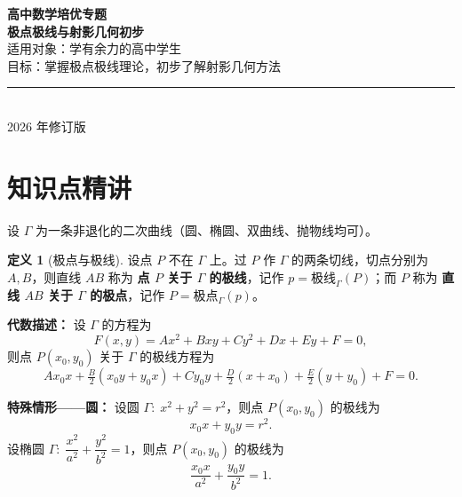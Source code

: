 \documentclass[12pt,a4paper]{ctexart}
\theoremstyle{definition}
\newtheorem*{defn}{定义}
\newcommand{\polar}{\text{极线}}
\newcommand{\pole}{\text{极点}}
\begin{document}
\begin{titlepage}
\centering
\vspace*{3cm}
{\Huge\bfseries\color{titleblue} 高中数学培优专题}\\[1.2cm]
{\LARGE\bfseries\color{accentred} 极点极线与射影几何初步}\\[2cm]
{\large\color{darkgray} 适用对象：学有余力的高中学生}\\[0.6cm]
{\large\color{darkgray} 目标：掌握极点极线理论，初步了解射影几何方法}\\[3cm]
\rule{0.6\textwidth}{0.4pt}\\[0.8cm]
{\large\color{titleblue} 2026 年修订版}
\vfill
\end{titlepage}

\tableofcontents
\newpage

\section{知识点精讲}

\begin{knowledgebox}
设 $\Gamma$ 为一条非退化的二次曲线（圆、椭圆、双曲线、抛物线均可）。

\begin{defn}[极点与极线]
设点 $P$ 不在 $\Gamma$ 上。过 $P$ 作 $\Gamma$ 的两条切线，切点分别为 $A,B$，则直线 $AB$ 称为 \textbf{点 $P$ 关于 $\Gamma$ 的极线}，记作 $p=\polar_\Gamma(P)$；而 $P$ 称为 \textbf{直线 $AB$ 关于 $\Gamma$ 的极点}，记作 $P=\pole_\Gamma(p)$。
\end{defn}

\vspace{4pt}
\textbf{代数描述：}
设 $\Gamma$ 的方程为
\[
  F(x,y) = Ax^2 + Bxy + Cy^2 + Dx + Ey + F = 0,
\]
则点 $P(x_0,y_0)$ 关于 $\Gamma$ 的极线方程为
\[
  Ax_0 x + \tfrac{B}{2}(x_0 y + y_0 x) + Cy_0 y + \tfrac{D}{2}(x+x_0) + \tfrac{E}{2}(y+y_0) + F = 0.
\]

\textbf{特殊情形——圆：}
设圆 $\Gamma:\; x^2+y^2=r^2$，则点 $P(x_0,y_0)$ 的极线为
\[
  x_0 x + y_0 y = r^2.
\]
设椭圆 $\Gamma:\; \dfrac{x^2}{a^2}+\dfrac{y^2}{b^2}=1$，则点 $P(x_0,y_0)$ 的极线为
\[
  \frac{x_0 x}{a^2}+\frac{y_0 y}{b^2}=1.
\]
\end{knowledgebox}
\end{document}
